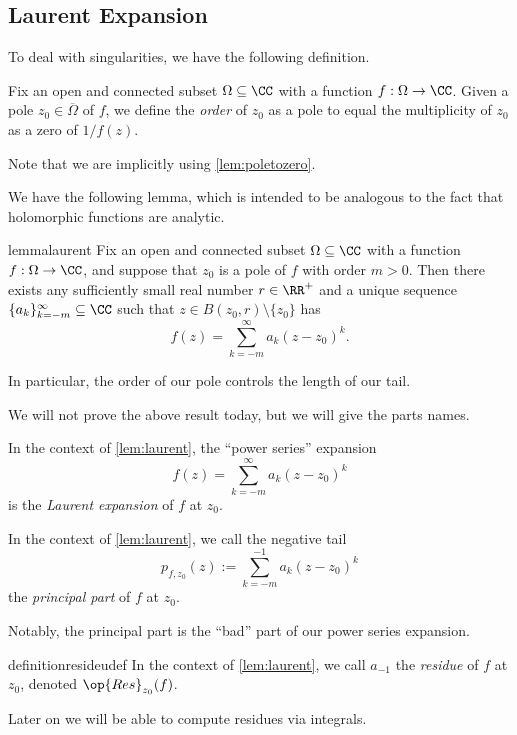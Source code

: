 \subsection{Laurent Expansion}
To deal with singularities, we have the following definition.
\begin{definition}[Order]
	Fix an open and connected subset $\Omega\subseteq\CC$ with a function $f:\Omega\to\CC$. Given a pole $z_0\in\overline\Omega$ of $f$, we define the \textit{order} of $z_0$ as a pole to equal the multiplicity of $z_0$ as a zero of $1/f(z)$.
\end{definition}
Note that we are implicitly using \autoref{lem:poletozero}.

We have the following lemma, which is intended to be analogous to the fact that holomorphic functions are analytic.
\begin{restatable}{lemma}{laurent} \label{lem:laurent}
	Fix an open and connected subset $\Omega\subseteq\CC$ with a function $f:\Omega\to\CC$, and suppose that $z_0$ is a pole of $f$ with order $m>0$. Then there exists any sufficiently small real number $r\in\RR^+$ and a unique sequence $\{a_k\}_{k=-m}^\infty\subseteq\CC$ such that $z\in B(z_0,r)\setminus\{z_0\}$ has
	\[f(z)=\sum_{k=-m}^\infty a_k(z-z_0)^k.\]
\end{restatable}
\noindent In particular, the order of our pole controls the length of our tail.

We will not prove the above result today, but we will give the parts names.
\begin{definition}
	In the context of \autoref{lem:laurent}, the ``power series'' expansion
	\[f(z)=\sum_{k=-m}^\infty a_k(z-z_0)^k\]
	is the \textit{Laurent expansion} of $f$ at $z_0$.
\end{definition}
\begin{definition}
	In the context of \autoref{lem:laurent}, we call the negative tail
	\[p_{f,z_0}(z):=\sum_{k=-m}^{-1}a_k(z-z_0)^k\]
	the \textit{principal part} of $f$ at $z_0$.
\end{definition}
Notably, the principal part is the ``bad'' part of our power series expansion.
\begin{restatable}[Residue]{definition}{resideudef}
	In the context of \autoref{lem:laurent}, we call $a_{-1}$ the \textit{residue} of $f$ at $z_0$, denoted $\op{Res}_{z_0}(f)$.
\end{restatable}
Later on we will be able to compute residues via integrals.